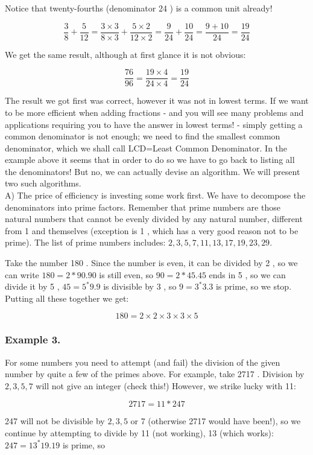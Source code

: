 \documentclass{ximera}
\begin{document}
Notice that twenty-fourths (denominator 24 ) is a common unit already!

$$\frac{3}{8}+\frac{5}{12}=\frac{3 \times 3}{8 \times 3}+\frac{5 \times 2}{12 \times 2}=\frac{9}{24}+\frac{10}{24}=\frac{9+10}{24}=\frac{19}{24}$$

We get the same result, although at first glance it is not obvious:

$$\frac{76}{96}=\frac{19 \times 4}{24 \times 4}=\frac{19}{24}$$

The result we got first was correct, however it was not in lowest terms. If we want to be more efficient when adding fractions - and you will see many problems and applications requiring you to have the answer in lowest terms! - simply getting a common denominator is not enough; we need to find the smallest common denominator, which we shall call LCD=Least Common Denominator. In the example above it seems that in order to do so we have to go back to listing all the denominators! But no, we can actually devise an algorithm. We will present two such algorithms.\\
A) The price of efficiency is investing some work first. We have to decompose the denominators into prime factors. Remember that prime numbers are those natural numbers that cannot be evenly divided by any natural number, different from 1 and themselves (exception is 1 , which has a very good reason not to be prime). The list of prime numbers includes: $2,3,5,7,11,13,17,19,23,29$.

Take the number 180 . Since the number is even, it can be divided by 2 , so we can write $180=2 * 90.90$ is still even, so $90=2 * 45.45$ ends in 5 , so we can divide it by 5 , $45=5^{*} 9.9$ is divisible by 3 , so $9=3^{*} 3.3$ is prime, so we stop. Putting all these together we get:

$$180=2 \times 2 \times 3 \times 3 \times 5$$

\subsubsection*{Example 3.}
For some numbers you need to attempt (and fail) the division of the given number by quite a few of the primes above. For example, take 2717 . Division by $2,3,5,7$ will not give an integer (check this!) However, we strike lucky with 11:

$$2717=11 * 247$$

247 will not be divisible by $2,3,5$ or 7 (otherwise 2717 would have been!), so we continue by attempting to divide by 11 (not working), 13 (which works): $247=13^{*} 19.19$ is prime, so
\end{document}

